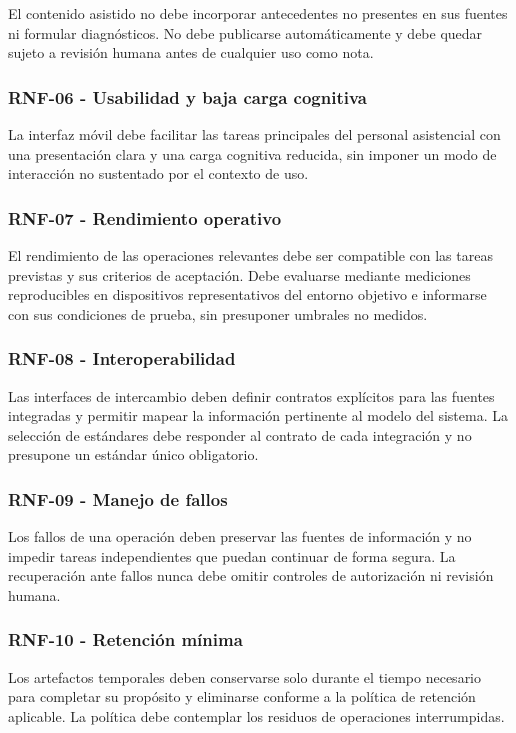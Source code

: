 El contenido asistido no debe incorporar antecedentes no presentes en sus fuentes ni formular diagnósticos. No debe publicarse automáticamente y debe quedar sujeto a revisión humana antes de cualquier uso como nota.

\subsubsection*{\textbf{RNF-06} - Usabilidad y baja carga cognitiva}

La interfaz móvil debe facilitar las tareas principales del personal asistencial con una presentación clara y una carga cognitiva reducida, sin imponer un modo de interacción no sustentado por el contexto de uso.

\subsubsection*{\textbf{RNF-07} - Rendimiento operativo}

El rendimiento de las operaciones relevantes debe ser compatible con las tareas previstas y sus criterios de aceptación. Debe evaluarse mediante mediciones reproducibles en dispositivos representativos del entorno objetivo e informarse con sus condiciones de prueba, sin presuponer umbrales no medidos.

\subsubsection*{\textbf{RNF-08} - Interoperabilidad}

Las interfaces de intercambio deben definir contratos explícitos para las fuentes integradas y permitir mapear la información pertinente al modelo del sistema. La selección de estándares debe responder al contrato de cada integración y no presupone un estándar único obligatorio.

\subsubsection*{\textbf{RNF-09} - Manejo de fallos}

Los fallos de una operación deben preservar las fuentes de información y no impedir tareas independientes que puedan continuar de forma segura. La recuperación ante fallos nunca debe omitir controles de autorización ni revisión humana.

\subsubsection*{\textbf{RNF-10} - Retención mínima}

Los artefactos temporales deben conservarse solo durante el tiempo necesario para completar su propósito y eliminarse conforme a la política de retención aplicable. La política debe contemplar los residuos de operaciones interrumpidas.
